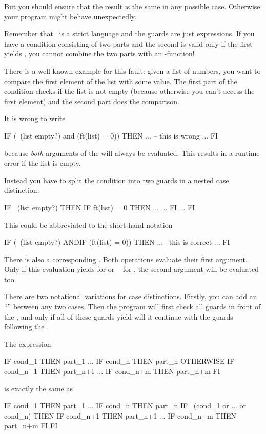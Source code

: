 But you should ensure that the result is the same in any possible
case. Otherwise your program might behave unexpectedly.

\medskip
Remember that \opal\ is a strict language and the guards are just
expressions.
If you have a condition consisting of two parts and the second is
valid only if the first yields , you cannot combine the two
parts with an -function!

There is a well-known example for this fault:
given a list of numbers, you want to compare the first element of the
list with some value.
The first part of the condition checks if the list is not empty
(because otherwise you can't access the first element) and the second
part does the comparison.

It is wrong to write
\begin{prog}
     IF (~(list empty?) and (ft(list) = 0)) THEN ... -- this is wrong
     ...
     FI
\end{prog}
because {\em both\/} arguments of the  will always be
evaluated.
This results in a runtime-error if the list is empty.

Instead you have to split the condition into two guards in a nested
case distinction:
\begin{prog}
        IF ~(list empty?) THEN
                    IF  ft(list) = 0 THEN ...
                    ...
                    FI
        ...
        FI
\end{prog}
This could be abbreviated to the short-hand notation
\begin{prog}
     IF (~(list empty?) ANDIF (ft(list) = 0)) THEN ...-- this is correct
     ...
     FI
\end{prog}
There is also a corresponding .
Both operations evaluate their first argument.
 Only if this evaluation yields  for
 or ~ for , the second argument will
be evaluated too.
\bigskip

\advanced There are two notational variations for case distinctions.
Firstly, you can add an ``'' between any two cases.
Then the program will first check all guards in front of the
, and 
only if all of these guards yield  will it continue with
the guards following the .
\smallskip

\noindent The expression 
\begin{prog}
        IF cond_1 THEN part_1
        ...
        IF cond_n THEN part_n 
        OTHERWISE 
        IF cond_n+1 THEN part_n+1
        ...
        IF cond_n+m THEN part_n+m 
        FI 
\end{prog}
is exactly the same as 
\begin{prog}
        IF cond_1 THEN part_1
        ...
        IF cond_n THEN part_n 
        IF ~(cond_1 or ... or cond_n) 
           THEN 
              IF cond_n+1 THEN part_n+1
              ...
              IF cond_n+m THEN part_n+m
              FI
        FI  
\end{prog}


